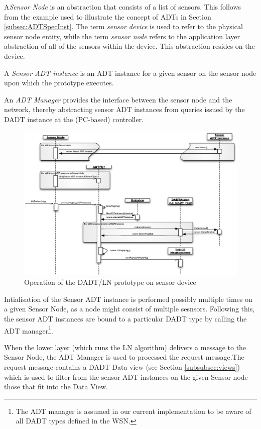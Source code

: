 A\emph{Sensor Node} is an abstraction that consists of a list of sensors. This
follows from the example used to illustrate the concept of ADTs in Section
\ref{subsec:ADTSpecInst}. The term \emph{sensor device} is used to refer to the
physical sensor node entity, while the term \emph{sensor node} refers to the application
layer abstraction of all of the sensors within the device. This abstraction
resides on the device.

A \emph{Sensor ADT instance} is an ADT instance for a given sensor on the sensor
node upon which the prototype executes.

An \emph{ADT Manager} provides the interface between the sensor node and the
network, thereby abstracting sensor ADT instances from queries issued by the DADT
instance at the (PC-based) controller.

\begin{figure}
\centering
\includegraphics[width=\textwidth]{img/SeqDiagram_Sensornode.eps}
\caption[Operation of the DADT/LN prototype on sensor device]{Operation of the DADT/LN prototype on sensor device}
\label{Fig:SeqDiagram_Sensornode}
\end{figure}

Intialisation of the Sensor ADT instance is performed possibly
multiple times on a given Sensor Node, as a node might consist of multiple sesnsors. Following
this, the sensor ADT instances are bound to a particular DADT type by calling
the ADT manager\footnote{The ADT manager is assumed in our
current implementation to be aware of all DADT types defined in the WSN.}.

When the lower layer (which runs the LN algorithm) delivers a message to the
Sensor Node, the ADT Manager is used to processed the request message.The
request message contains a DADT Data view (see Section \ref{subsubsec:views})
which is used to filter from the sensor ADT instances on the given Sensor node
those that fit into the Data View. 

